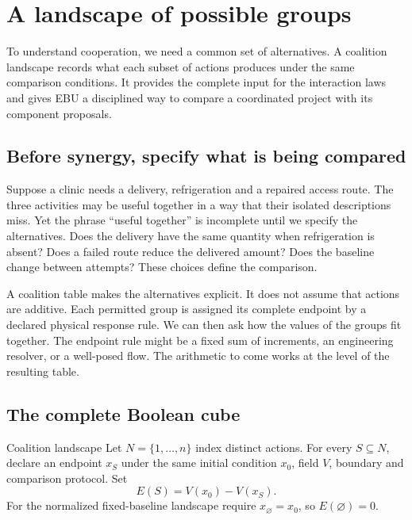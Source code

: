 \chapter{A landscape of possible groups}\label{ch:coalitions}

To understand cooperation, we need a common set of alternatives. A coalition landscape records what each subset of actions produces under the same comparison conditions. It provides the complete input for the interaction laws and gives EBU a disciplined way to compare a coordinated project with its component proposals.


\section{Before synergy, specify what is being compared}
Suppose a clinic needs a delivery, refrigeration and a repaired access route. The three activities may be useful together in a way that their isolated descriptions miss. Yet the phrase ``useful together'' is incomplete until we specify the alternatives. Does the delivery have the same quantity when refrigeration is absent? Does a failed route reduce the delivered amount? Does the baseline change between attempts? These choices define the comparison.

A coalition table makes the alternatives explicit. It does not assume that actions are additive. Each permitted group is assigned its complete endpoint by a declared physical response rule. We can then ask how the values of the groups fit together. The endpoint rule might be a fixed sum of increments, an engineering resolver, or a well-posed flow. The arithmetic to come works at the level of the resulting table.

\section{The complete Boolean cube}
\begin{definition}{Coalition landscape}\label{def:coalition}
Let $N=\{1,\ldots,n\}$ index distinct actions. For every $S\subseteq N$, declare an endpoint $x_S$ under the same initial condition $x_0$, field $V$, boundary and comparison protocol. Set
\begin{equation}\label{eq:coalition-value}
 E(S)=V(x_0)-V(x_S).
\end{equation}
For the normalized fixed-baseline landscape require $x_\varnothing=x_0$, so $E(\varnothing)=0$.
\end{definition}

